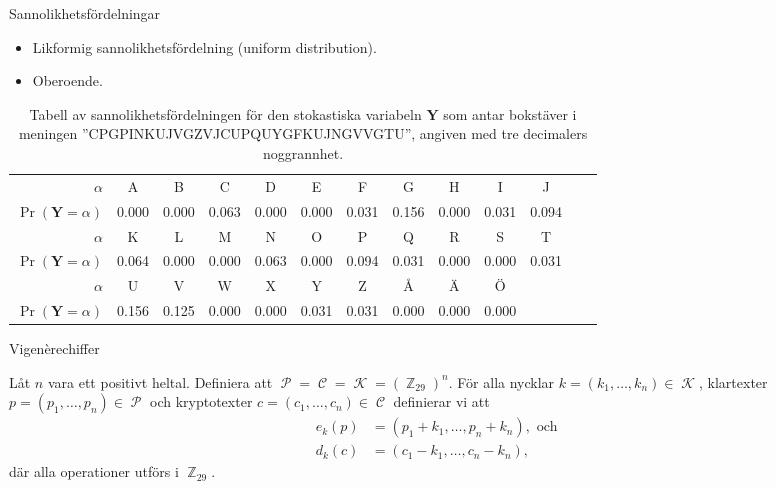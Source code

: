 \documentclass{beamer}
\theoremstyle{definition}
\DeclareMathOperator{\p}{\mathcal{P}}
\let\P\p
\DeclareMathOperator{\C}{\mathcal{C}}
\DeclareMathOperator{\K}{\mathcal{K}}
\DeclareMathOperator{\Z}{\mathbb{Z}}
\let\stoch\mathbf
\renewcommand{\p}{\stoch P}
\newcommand{\y}{\stoch Y}
\begin{document}
\begin{frame}{\insertsubsectionhead}{Sannolikhetsfördelningar}
  \begin{itemize}
    \item Likformig sannolikhetsfördelning (uniform distribution).
    \item Oberoende.
  \end{itemize}
\end{frame}

\begin{frame}{\insertsubsectionhead}
  \begin{table}
    \centering\tiny
    \begin{tabular}{r|cccccccccccc}
      \toprule
      \(\alpha\) & A & B & C & D & E & F & G & H & I & J \\
      \(\Pr(\y = \alpha)\) & 0.000 & 0.000 & 0.063  & 0.000 & 0.000 & 0.031 
      & 0.156 & 0.000 & 0.031 & 0.094 \\
      \midrule
      \(\alpha\) & K & L & M & N & O & P & Q & R & S & T \\
      \(\Pr(\y = \alpha)\) & 0.064 & 0.000 & 0.000 & 0.063 & 0.000 & 0.094 
      & 0.031 & 0.000 & 0.000 & 0.031 \\
      \midrule
      \(\alpha\) & U & V & W & X & Y & Z & Å & Ä & Ö \\
      \(\Pr(\y = \alpha)\) & 0.156 & 0.125 & 0.000 & 0.000 &  0.031 & 0.031 
      & 0.000 & 0.000 & 0.000 \\
      \bottomrule
    \end{tabular}
    \caption{Tabell av sannolikhetsfördelningen för den stokastiska variabeln 
    \(\y\) som antar bokstäver i meningen ''CPGPINKUJVGZVJCUPQUYGFKUJNGVVGTU'', 
    angiven med tre decimalers noggrannhet.}
    \label{tbl:SannolikhetstabellKryptotext}
  \end{table}
\end{frame}

\begin{frame}{\insertsubsectionhead}{Vigenèrechiffer}
  \begin{definition}[Vigenèrechiffer]
    Låt \(n\) vara ett positivt heltal.
    Definiera att \(\P = \C = \K = (\Z_{29})^n\).
    För alla nycklar \(k = (k_1,\ldots,k_n)\in \K\), klartexter \(p = (p_1, 
    \ldots, p_n)\in \P\) och kryptotexter \(c = (c_1,\ldots,c_n)\in \C\) 
    definierar vi att
    \begin{align}
      \nonumber
      e_k(p) &= (p_1 + k_1, \ldots, p_n + k_n), \text{ och } \\
      \nonumber
      d_k(c) &= (c_1 - k_1, \ldots, c_n - k_n),
    \end{align}
    där alla operationer utförs i \(\Z_{29}\).
  \end{definition}
\end{frame}
\end{document}
